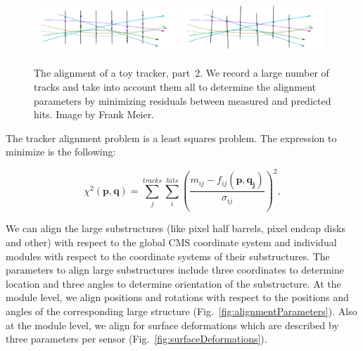 \begin{figure}[htb]
    \begin{center}
        \includegraphics[width=0.48\textwidth]{../figs/Alignment/toyTracker12.png}
        \includegraphics[width=0.48\textwidth]{../figs/Alignment/toyTracker13.png}
    \end{center}
    \caption{The alignment of a toy tracker, part~2. We record a large number of tracks and take into account them all to determine the alignment parameters by minimizing residuals between measured and predicted hits. Image by Frank Meier.}
    \label{fig:toyTracker_part2}
\end{figure}



The tracker alignment problem is a least squares problem. The expression to minimize is the following:

\begin{equation}
  \chi^2(\mathbf{p},\mathbf{q})=\sum_j^{tracks} \sum_i^{hits} \left( {\frac{m_{ij}-f_{ij}(\mathbf{p},\mathbf{q_j})}{\sigma_{ij}}} \right)^2,
\end{equation}


We can align the large substructures (like pixel half barrels, pixel endcap disks and other) with respect to the global CMS coordinate system and individual modules with respect to the coordinate systems of their substructures. The parameters to align large substructures include three coordinates to determine location and three angles to determine orientation of the substructure. At the module level, we align positions and rotations with respect to the positions and angles of the corresponding large structure (Fig.~\ref{fig:alignmentParameters}). Also at the module level, we align for surface deformations which are described by three parameters per sensor (Fig.~\ref{fig:surfaceDeformations}). 

